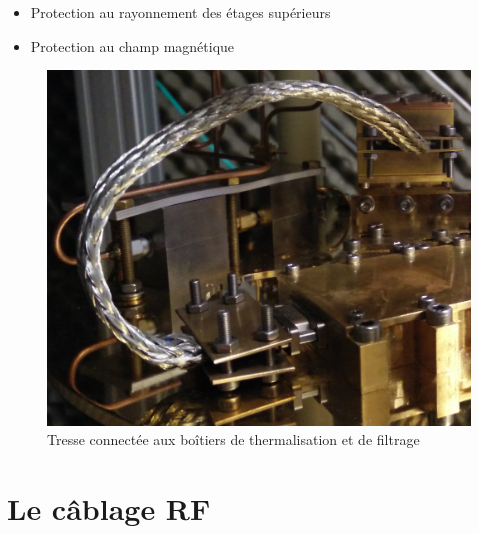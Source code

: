 \documentclass[10pt,a9paper,handout]{beamer} \usepackage[utf8]{inputenc} \usepackage[francais]{babel} \usepackage[T1]{fontenc}
\begin{document}
\begin{frame}
\begin{itemize}
    \item Protection au rayonnement des étages supérieurs
    \vspace*{2mm}
    \item Protection au champ magnétique\\
\end{itemize}

\vspace*{3mm}
\begin{figure}[h]
    \centering
    \includegraphics[height=0.35\textwidth]{Images/Tresse}
    \caption{Tresse connectée aux boîtiers de thermalisation et de filtrage}
\end{figure}
\end{frame}

\section{Le câblage RF}
\end{document}

